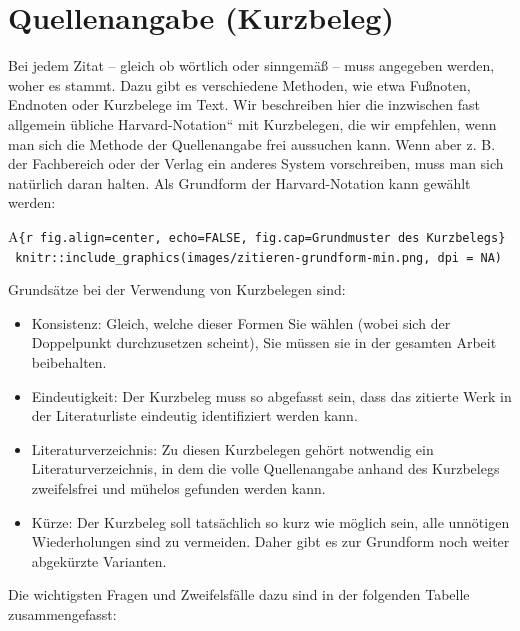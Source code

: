 \documentclass[]{book}
\providecommand{\tightlist}{%
  \setlength{\itemsep}{0pt}\setlength{\parskip}{0pt}}
\theoremstyle{definition}
\theoremstyle{definition}
\theoremstyle{definition}
\theoremstyle{remark}
\begin{document}
\section{Quellenangabe (Kurzbeleg)}\label{quellenangabe-kurzbeleg}

Bei jedem Zitat -- gleich ob wörtlich oder sinngemäß -- muss angegeben
werden, woher es stammt. Dazu gibt es verschiedene Methoden, wie etwa
Fußnoten, Endnoten oder Kurzbelege im Text. Wir beschreiben hier die
inzwischen fast allgemein übliche Harvard-Notation`` mit Kurzbelegen,
die wir empfehlen, wenn man sich die Methode der Quellenangabe frei
aussuchen kann. Wenn aber z. B. der Fachbereich oder der Verlag ein
anderes System vorschreiben, muss man sich natürlich daran halten. Als
Grundform der Harvard-Notation kann gewählt werden:

A\texttt{\{r\ fig.align=\textquotesingle{}center\textquotesingle{},\ echo=FALSE,\ fig.cap=\textquotesingle{}Grundmuster\ des\ Kurzbelegs\textquotesingle{}\}\ knitr::include\_graphics(\textquotesingle{}images/zitieren-grundform-min.png\textquotesingle{},\ dpi\ =\ NA)}

Grundsätze bei der Verwendung von Kurzbelegen sind:

\begin{itemize}
\tightlist
\item
  Konsistenz: Gleich, welche dieser Formen Sie wählen (wobei sich der
  Doppelpunkt durchzusetzen scheint), Sie müssen sie in der gesamten
  Arbeit beibehalten.
\item
  Eindeutigkeit: Der Kurzbeleg muss so abgefasst sein, dass das zitierte
  Werk in der Literaturliste eindeutig identifiziert werden kann.
\item
  Literaturverzeichnis: Zu diesen Kurzbelegen gehört notwendig ein
  Literaturverzeichnis, in dem die volle Quellenangabe anhand des
  Kurzbelegs zweifelsfrei und mühelos gefunden werden kann.
\item
  Kürze: Der Kurzbeleg soll tatsächlich so kurz wie möglich sein, alle
  unnötigen Wiederholungen sind zu vermeiden. Daher gibt es zur
  Grundform noch weiter abgekürzte Varianten.
\end{itemize}

Die wichtigsten Fragen und Zweifelsfälle dazu sind in der folgenden
Tabelle zusammengefasst:
\end{document}
